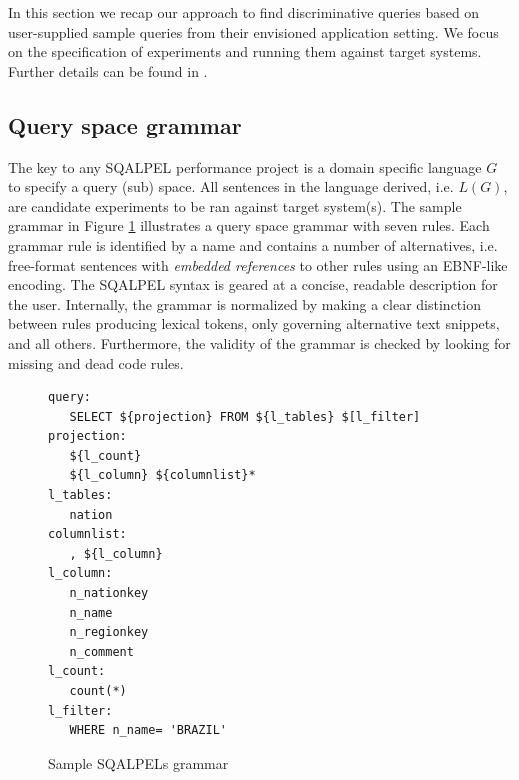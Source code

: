 \documentclass{cidr-2019}
\begin{document}
In this section we recap our approach to find discriminative queries based on user-supplied sample queries from their envisioned application setting.
We focus on the specification of experiments and running them against target systems.
Further details can be found in \cite{DBLP:conf/sigmod/KerstenKZ18}.

\subsection{Query space grammar}\label{specification}
The key to any {\sc SQALPEL} performance project is a domain specific language $G$ to specify a query (sub) space. 
All sentences in the language derived, i.e. $L(G)$, are candidate experiments to be
ran against target system(s).  The sample grammar in Figure \ref{fig:script1}
illustrates a query space grammar with seven rules.  Each grammar rule is
identified by a name and contains a number of alternatives, i.e. free-format
sentences with \textit{embedded references} to other rules using an EBNF-like
encoding.
The {\sc SQALPEL} syntax is geared at a concise, readable description for the user. 
Internally, the grammar is normalized by making a clear distinction
between rules producing lexical tokens, only governing alternative text
snippets, and all others. 
Furthermore, the validity of the grammar is checked by looking for missing and dead code rules. 

\begin{figure}[t]
	\begin{verbatim}
query:
   SELECT ${projection} FROM ${l_tables} $[l_filter]
projection:
   ${l_count}
   ${l_column} ${columnlist}*
l_tables:
   nation
columnlist:
   , ${l_column}
l_column:
   n_nationkey
   n_name
   n_regionkey
   n_comment
l_count:
   count(*)
l_filter:
   WHERE n_name= 'BRAZIL'
\end{verbatim}
	\caption{Sample {\sc SQALPELs}  grammar \label{fig:script1}}
\end{figure}
\end{document}
